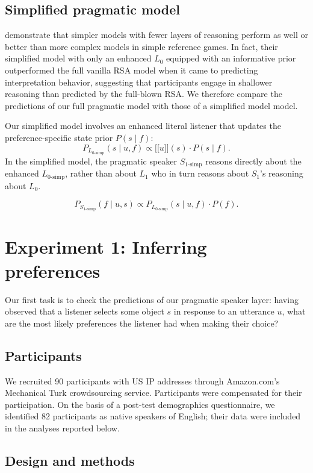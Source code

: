 \documentclass[10pt,a4paper]{article}
\newcommand{\sem}[1]{\mbox{$[\![$#1$]\!]$}}
\begin{document}
\subsection{Simplified pragmatic model}

 demonstrate that simpler models with fewer layers of reasoning perform as well or better than more complex models in simple reference games. In fact, their simplified model with only an enhanced $L_0$ equipped with an informative prior outperformed the full vanilla RSA model when it came to predicting interpretation behavior, suggesting that participants engage in shallower reasoning than predicted by the full-blown RSA. We therefore compare the predictions of our full pragmatic model with those of a simplified model model.

Our simplified model involves an enhanced literal listener that updates the preference-specific state prior $P(s\mid f)$:
$$P_{L_{0\textrm{-simp}}}(s\mid u,f) \propto \sem{$u$}(s) \cdot P(s\mid f).$$
In the simplified model, the pragmatic speaker $S_{1\textrm{-simp}}$ reasons directly about the enhanced $L_{0\textrm{-simp}}$, rather than about $L_1$ who in turn reasons about $S_1$'s reasoning about $L_0$.

$$P_{S_{1\textrm{-simp}}}(f\mid u,s) \propto P_{L_{0\textrm{-simp}}}(s\mid u,f) \cdot P(f).$$



\section{Experiment 1: Inferring preferences}

Our first task is to check the predictions of our pragmatic speaker layer: having observed that a listener selects some object $s$ in response to an utterance $u$, what are the most likely preferences the listener had when making their choice? 

\subsection{Participants}

We recruited 90 participants with US IP addresses through Amazon.com's Mechanical Turk crowdsourcing service. Participants were compensated for their participation. On the basis of a post-test demographics questionnaire, we identified 82 participants as native speakers of English; their data were included in the analyses reported below.

\subsection{Design and methods}
\end{document}
